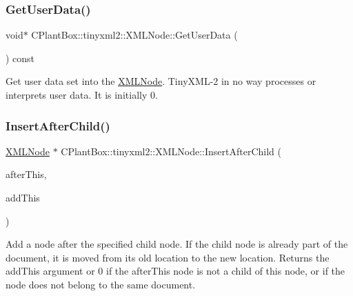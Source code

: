 \subsubsection{\texorpdfstring{Get\+User\+Data()}{GetUserData()}}
{\footnotesize\ttfamily void$\ast$ C\+Plant\+Box\+::tinyxml2\+::\+X\+M\+L\+Node\+::\+Get\+User\+Data (\begin{DoxyParamCaption}{ }\end{DoxyParamCaption}) const\hspace{0.3cm}{\ttfamily [inline]}}

Get user data set into the \hyperlink{classCPlantBox_1_1tinyxml2_1_1XMLNode}{X\+M\+L\+Node}. Tiny\+X\+M\+L-\/2 in no way processes or interprets user data. It is initially 0. \mbox{\label{classCPlantBox_1_1tinyxml2_1_1XMLNode_a6cc9b466c5dd967e36b35dc809a2fc12}} 
\subsubsection{\texorpdfstring{Insert\+After\+Child()}{InsertAfterChild()}}
{\footnotesize\ttfamily \hyperlink{classCPlantBox_1_1tinyxml2_1_1XMLNode}{X\+M\+L\+Node} $\ast$ C\+Plant\+Box\+::tinyxml2\+::\+X\+M\+L\+Node\+::\+Insert\+After\+Child (\begin{DoxyParamCaption}\item[{\hyperlink{classCPlantBox_1_1tinyxml2_1_1XMLNode}{X\+M\+L\+Node} $\ast$}]{after\+This,  }\item[{\hyperlink{classCPlantBox_1_1tinyxml2_1_1XMLNode}{X\+M\+L\+Node} $\ast$}]{add\+This }\end{DoxyParamCaption})}

Add a node after the specified child node. If the child node is already part of the document, it is moved from its old location to the new location. Returns the add\+This argument or 0 if the after\+This node is not a child of this node, or if the node does not belong to the same document. \mbox{\label{classCPlantBox_1_1tinyxml2_1_1XMLNode_a5601da67d3f1cead3ac5b6018cee22e9}} 
